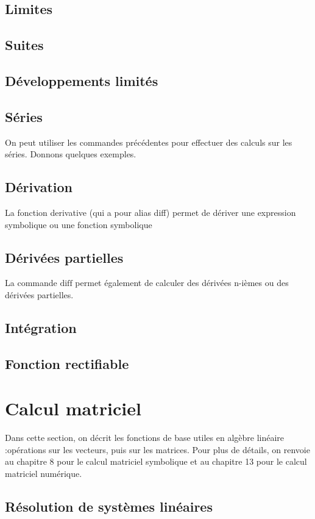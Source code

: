  \subsection{Limites}
 \subsection{Suites}
 \subsection{Développements limités}
 \subsection{Séries}
  On peut utiliser les commandes précédentes pour effectuer des calculs sur les séries. Donnons quelques exemples.
 \subsection{Dérivation}
 La fonction derivative (qui a pour alias diff) permet de dériver une expression symbolique ou une fonction symbolique
 \subsection{Dérivées partielles}
 La commande $\mathrm{diff}$ permet également de calculer des dérivées n-ièmes ou des dérivées partielles.

 \subsection{Intégration}
 \subsection{Fonction rectifiable}
 
 \section{Calcul matriciel}
  Dans cette section, on décrit les fonctions de base utiles en algèbre linéaire :opérations sur les vecteurs, puis sur les matrices. Pour plus de détails, on renvoie au chapitre 8 pour le calcul matriciel symbolique et au chapitre 13 pour le calcul matriciel numérique.
  \subsection{Résolution de systèmes linéaires}
